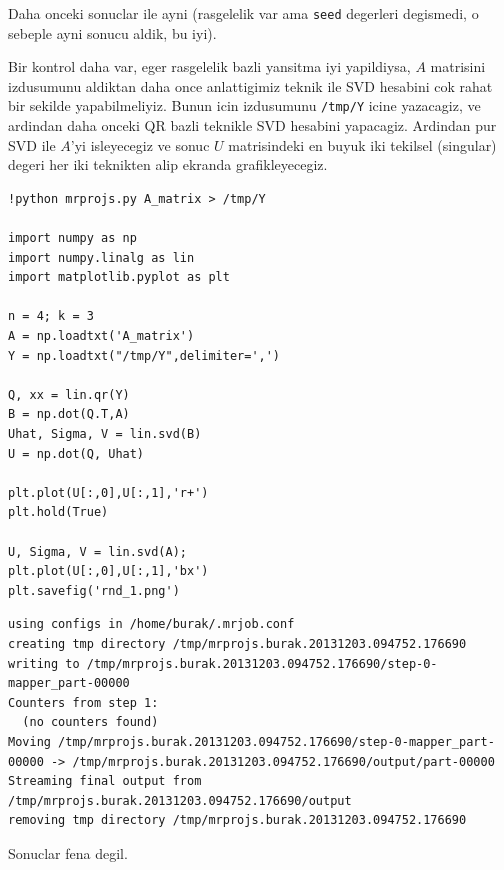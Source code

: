 \documentclass[12pt,fleqn]{article}\usepackage{../common}
\begin{document}
Daha onceki sonuclar ile ayni (rasgelelik var ama \verb!seed!
degerleri degismedi, o sebeple ayni sonucu aldik, bu iyi).

Bir kontrol daha var, eger rasgelelik bazli yansitma iyi yapildiysa, $A$
matrisini izdusumunu aldiktan daha once anlattigimiz teknik ile SVD
hesabini cok rahat bir sekilde yapabilmeliyiz. Bunun icin izdusumunu
\verb!/tmp/Y! icine yazacagiz, ve ardindan daha onceki QR bazli
teknikle SVD hesabini yapacagiz. Ardindan pur SVD ile $A$'yi isleyecegiz ve
sonuc $U$ matrisindeki en buyuk iki tekilsel (singular) degeri her iki
teknikten alip ekranda grafikleyecegiz.

\begin{verbatim}
!python mrprojs.py A_matrix > /tmp/Y

import numpy as np
import numpy.linalg as lin
import matplotlib.pyplot as plt

n = 4; k = 3
A = np.loadtxt('A_matrix')
Y = np.loadtxt("/tmp/Y",delimiter=',')

Q, xx = lin.qr(Y)
B = np.dot(Q.T,A)
Uhat, Sigma, V = lin.svd(B)
U = np.dot(Q, Uhat)

plt.plot(U[:,0],U[:,1],'r+')
plt.hold(True)

U, Sigma, V = lin.svd(A);
plt.plot(U[:,0],U[:,1],'bx')
plt.savefig('rnd_1.png')
\end{verbatim}

\begin{verbatim}
using configs in /home/burak/.mrjob.conf
creating tmp directory /tmp/mrprojs.burak.20131203.094752.176690
writing to /tmp/mrprojs.burak.20131203.094752.176690/step-0-mapper_part-00000
Counters from step 1:
  (no counters found)
Moving /tmp/mrprojs.burak.20131203.094752.176690/step-0-mapper_part-00000 -> /tmp/mrprojs.burak.20131203.094752.176690/output/part-00000
Streaming final output from /tmp/mrprojs.burak.20131203.094752.176690/output
removing tmp directory /tmp/mrprojs.burak.20131203.094752.176690
\end{verbatim}

Sonuclar fena degil.
\end{document}
